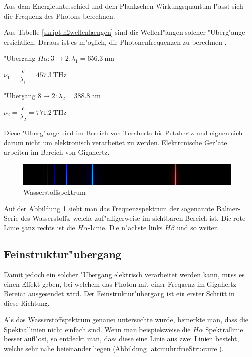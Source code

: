 \begin{refsection}
Aus dem Energieunterschied und dem Plankschen Wirkungsquantum l"asst
sich die Frequenz des Photons
berechnen. %

Aus Tabelle \ref{skript:h2wellenlaengen} sind die Wellenl"angen
solcher "Uberg"ange ersichtlich. Daraus ist es m"oglich, die
Photonenfrequenzen zu berechnen \cite{Gerthsen}.
\begin{center}
	"Ubergang $H\alpha: 3 \rightarrow 2: \lambda_1 = \SI{656.3}{\nano\meter}$

$\nu_1 = \dfrac{c}{\lambda_1} = \SI{457.3}{\tera\hertz}$
\vspace{.5cm}

"Ubergang $8 \rightarrow 2: \lambda_2 = \SI{388.8}{\nano\meter}$

$\nu_2 = \dfrac{c}{\lambda_2} = \SI{771.2}{\tera\hertz}$
\end{center}	

Diese "Uberg"ange sind im Bereich von Terahertz bis Petahertz und
eignen sich darum nicht um elektronisch verarbeitet zu
werden. Elektronische Ger"ate arbeiten im Bereich von Gigahertz.

\begin{figure}
	\centering
	\includegraphics[width = .6\columnwidth]{atomuhr/wasserstoffSpektrum.jpg}
	\caption{Wasserstoffspektrum \cite{pic:wasserstoffspektrum}} 
	\label{atomuhr:wasserstoffspektrum}
\end{figure}

Auf der Abbildung \ref{atomuhr:wasserstoffspektrum} sieht man das
Frequenzspektrum der sogenannte Balmer-Serie des Wasserstoffs, welche
zuf"alligerweise im sichtbaren Bereich ist. Die rote Linie ganz rechts
ist die $H\alpha$-Linie. Die n"achste links $H\beta$ und so weiter.


\subsection{Feinstruktur"ubergang}
Damit jedoch ein solcher "Ubergang elektrisch verarbeitet werden kann,
muss es einen Effekt geben, bei welchem das Photon mit einer Frequenz
im Gigahertz Bereich ausgesendet wird.  Der Feinstruktur"ubergang ist
ein erster Schritt in diese Richtung.

Als das Wasserstoffspektrum genauer untersuchte wurde, bemerkte man,
dass die Spektrallinien nicht einfach sind. Wenn man beispielsweise die
$H\alpha$ Spektrallinie besser aufl"ost, so entdeckt man, dass diese
eine Linie aus zwei Linien besteht, welche sehr nahe beieinander
liegen (Abbildung \ref{atomuhr:fineStructure}).


\end{refsection}
